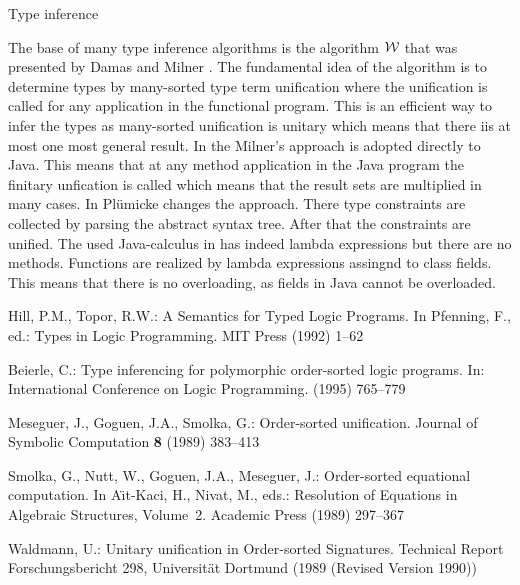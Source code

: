 Type inference

The base of many type inference algorithms is the algorithm ${\cal W}$
that was presented by Damas and Milner \cite{DM82}. The fundamental idea
of the algorithm is to determine types by many-sorted type term
unification \cite{Rob65, MM82} where the unification is called for any
application in the functional program. This is an efficient way to infer the types
as many-sorted unification is unitary which means that there iis at most one
most general result.  In \cite{Plue07_3} the Milner's approach is adopted
directly to Java. This means that at any method application in the Java program
the finitary unfication is called which means that the result sets are multiplied in
many cases. In \cite{plue15_2} Pl\"umicke changes the approach. There 
type constraints are collected by parsing the abstract syntax tree. After that the
constraints are unified. The used Java-calculus in \cite{plue15_2} has
indeed lambda expressions but there are no methods. Functions are realized by
lambda expressions assingnd to class fields. This means that there is no
overloading, as fields in Java cannot be overloaded.



\begin{thebibliography}{5}
Hill, P.M., Topor, R.W.:
\newblock A {S}emantics for {T}yped {L}ogic {P}rograms.
\newblock In Pfenning, F., ed.: Types in Logic Programming.
\newblock MIT Press (1992)  1--62

Beierle, C.:
\newblock Type inferencing for polymorphic order-sorted logic programs.
\newblock In: International Conference on Logic Programming. (1995)  765--779

Meseguer, J., Goguen, J.A., Smolka, G.:
\newblock Order-sorted unification.
\newblock Journal of Symbolic Computation \textbf{8} (1989)  383--413

Smolka, G., Nutt, W., Goguen, J.A., Meseguer, J.:
\newblock Order-sorted equational computation.
\newblock In A{\"\i}t-Kaci, H., Nivat, M., eds.: Resolution of Equations in
  Algebraic Structures, Volume~2.
\newblock Academic Press (1989)  297--367

Waldmann, U.:
\newblock Unitary unification in {O}rder-sorted {S}ignatures.
\newblock Technical Report Forschungsbericht 298, Universit{\"a}t Dortmund
  (1989 (Revised Version 1990))
\end{thebibliography}


